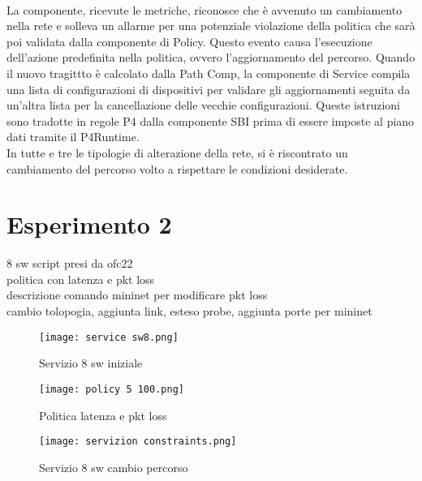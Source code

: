 \\La componente, ricevute le metriche, riconosce che è avvenuto un cambiamento nella rete e solleva un allarme per una potenziale violazione della politica che sarà poi validata dalla componente di Policy.
Questo evento causa l'esecuzione dell'azione predefinita nella politica, ovvero l'aggiornamento del percorso.
Quando il nuovo tragittto è calcolato dalla Path Comp, la componente di Service compila una lista di configurazioni di dispositivi per validare gli aggiornamenti 
seguita da un'altra lista per la cancellazione delle vecchie configurazioni. Queste istruzioni sono tradotte in regole P4 dalla componente SBI prima di essere imposte al piano dati 
tramite il P4Runtime.
\\In tutte e tre le tipologie di alterazione della rete, si è riscontrato un cambiamento del percorso volto a rispettare le condizioni desiderate. 
\section{Esperimento 2}
8 sw script presi da ofc22
\\politica con latenza e pkt loss
\\descrizione comando mininet per modificare pkt loss
\\cambio tolopogia, aggiunta link, esteso probe, aggiunta porte per mininet
\begin{figure}[h]
    \centering
   \texttt{[image: service sw8.png]}
    \caption{Servizio 8 sw iniziale}
    \label{fig:sw8}
\end{figure}

\begin{figure}[h]
    \centering
   \texttt{[image: policy 5 100.png]}
    \caption{Politica latenza e pkt loss}
    \label{fig:policy}
\end{figure}

\begin{figure}[h]
    \centering
   \texttt{[image: servizion constraints.png]}
    \caption{Servizio 8 sw cambio percorso}
    \label{fig:sw8 dopo}
\end{figure}

